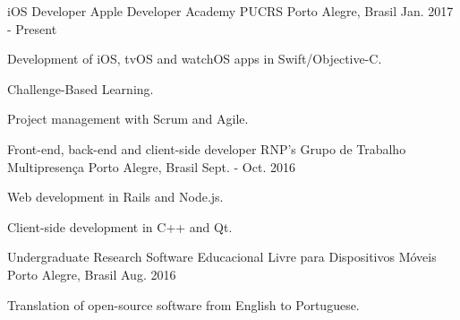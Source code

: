 \begin{cventries}
  \cventry
    {iOS Developer}
    {Apple Developer Academy PUCRS}
    {Porto Alegre, Brasil}
    {Jan. 2017 - Present}
    {
    \begin{cvitems}
      \item {Development of iOS, tvOS and watchOS apps in Swift/Objective-C.}
      \item {Challenge-Based Learning.}
      \item {Project management with Scrum and Agile.}
    \end{cvitems}
    }
  \cventry
    {Front-end, back-end and client-side developer}
    {RNP's Grupo de Trabalho Multipresença}
    {Porto Alegre, Brasil}
    {Sept. - Oct. 2016}
    {
      \begin{cvitems}
        \item {Web development in Rails and Node.js.}
        \item {Client-side development in C++ and Qt.}
      \end{cvitems}
    }
  \cventry
    {Undergraduate Research}
    {Software Educacional Livre para Dispositivos Móveis}
    {Porto Alegre, Brasil}
    {Aug. 2016}
    {
      \begin{cvitems}
        \item {Translation of open-source software from English to Portuguese.}
      \end{cvitems}
    }
\end{cventries}
